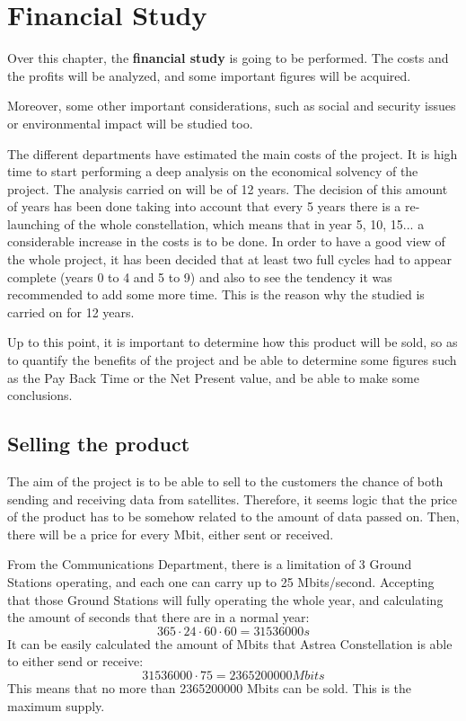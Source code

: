 \chapter{Financial Study}
Over this chapter, the \textbf{financial study} is going to be performed. The costs and the profits will be analyzed, and some important figures will be acquired. 

Moreover, some other important considerations, such as social and security issues or environmental impact will be studied too.

The different departments have estimated the main costs of the project. It is high time to start performing a deep analysis on the economical solvency of the project. The analysis carried on will be of 12 years. The decision of this amount of years has been done taking into account that every 5 years there is a re-launching of the whole constellation, which means that in year 5, 10, 15... a considerable increase in the costs is to be done. In order to have a good view of the whole project, it has been decided that at least two full cycles had to appear complete (years 0 to 4 and 5 to 9) and also to see the tendency it was recommended to add some more time. This is the reason why the studied is carried on for 12 years. 

Up to this point, it is important to determine how this product will be sold, so as to quantify the benefits of the project and be able to determine some figures such as the Pay Back Time or the Net Present value, and be able to make some conclusions. 

\section{Selling the product}
The aim of the project is to be able to sell to the customers the chance of both sending and receiving data from satellites. Therefore, it seems logic that the price of the product has to be somehow related to the amount of data passed on. Then, there will be a price for every Mbit, either sent or received. 

From the Communications Department, there is a limitation of 3 Ground Stations operating, and each one can carry up to 25 Mbits/second. Accepting that those Ground Stations will fully operating the whole year, and calculating the amount of seconds that there are in a normal year:
\begin{equation}
365 \cdot 24 \cdot 60 \cdot 60 = 31536000 s
\end{equation}
It can be easily calculated the amount of Mbits that Astrea Constellation is able to either send or receive:
\begin{equation}
31536000 \cdot 75 = 2365200000 Mbits
\end{equation}
This means that no more than 2365200000 Mbits can be sold. This is the maximum supply.

